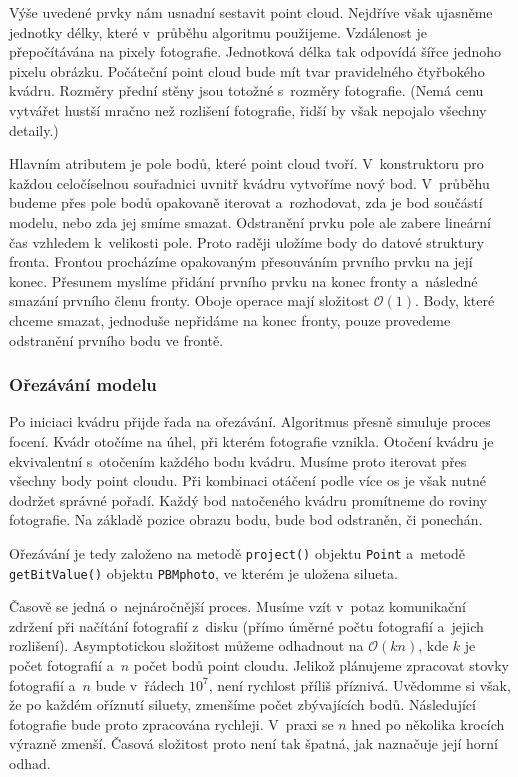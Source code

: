 \documentclass[12pt]{report}			%
\begin{document}
        	        Výše uvedené prvky nám usnadní sestavit point cloud. Nejdříve však ujasněme jednotky délky, které v~průběhu algoritmu použijeme. Vzdálenost je přepočítávána na pixely fotografie. Jednotková délka tak odpovídá šířce jednoho pixelu obrázku. Počáteční point cloud bude mít tvar pravidelného čtyřbokého kvádru. Rozměry přední stěny jsou totožné s~rozměry fotografie. (Nemá cenu vytvářet hustší mračno než rozlišení fotografie, řidší by však nepojalo všechny detaily.)
    
                    Hlavním atributem je pole bodů, které point cloud tvoří. V~konstruktoru pro každou celočíselnou souřadnici uvnitř kvádru vytvoříme nový bod. V~průběhu budeme přes pole bodů opakovaně iterovat a~rozhodovat, zda je bod součástí modelu, nebo zda jej smíme smazat. Odstranění prvku pole ale zabere lineární čas vzhledem k~velikosti pole. Proto raději uložíme body do datové struktury fronta. Frontou procházíme opakovaným přesouváním prvního prvku na její konec. Přesunem myslíme přidání prvního prvku na konec fronty a~následné smazání prvního členu fronty. Oboje operace mají složitost $\mathcal{O}(1)$. Body, které chceme smazat, jednoduše nepřidáme na konec fronty, pouze provedeme odstranění prvního bodu ve frontě.

                    \subsubsection{Ořezávání modelu}

                        Po iniciaci kvádru přijde řada na ořezávání. Algoritmus přesně simuluje proces focení. Kvádr otočíme na úhel, při kterém fotografie vznikla. Otočení kvádru je ekvivalentní s~otočením každého bodu kvádru. Musíme proto iterovat přes všechny body point cloudu. Při kombinaci otáčení podle více os je však nutné dodržet správné pořadí. Každý bod natočeného kvádru promítneme do roviny fotografie. Na základě pozice obrazu bodu, bude bod odstraněn, či ponechán.
    
                        Ořezávání je tedy založeno na  metodě \verb|project()| objektu \verb|Point| a~metodě \verb|getBitValue()| objektu \verb|PBMphoto|, ve kterém je uložena silueta.
    
                        Časově se jedná o~nejnáročnější proces. Musíme vzít v~potaz komunikační zdržení při načítání fotografií z~disku (přímo úměrné počtu fotografií a~jejich rozlišení). Asymptotickou složitost můžeme odhadnout na $\mathcal{O}(kn)$, kde $k$ je počet fotografií a~$n$ počet bodů point cloudu. Jelikož plánujeme zpracovat stovky fotografií a~$n$ bude v~řádech $10^7$, není rychlost příliš příznivá. Uvědomme si však, že po každém oříznutí siluety, zmenšíme počet zbývajících bodů. Následující fotografie bude proto zpracována rychleji. V~praxi se $n$ hned po několika krocích  výrazně zmenší. Časová složitost proto není tak špatná, jak naznačuje její horní odhad.
\end{document}

